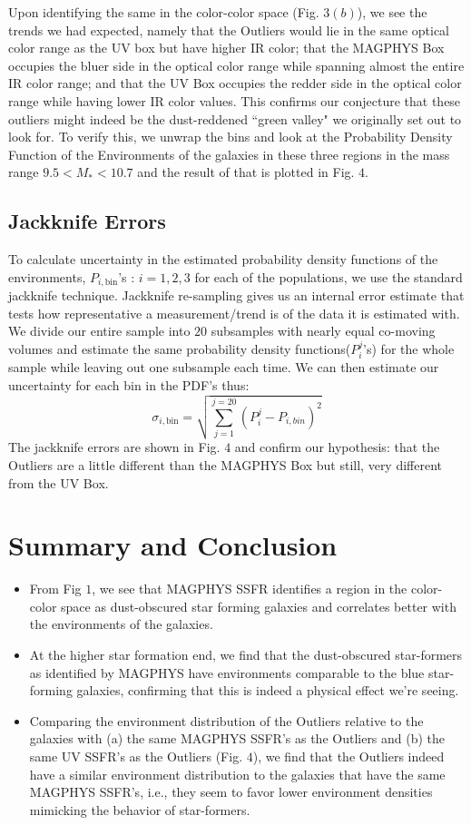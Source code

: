 \documentclass[iop]{emulateapj}
\begin{document}
Upon identifying the same in the color-color space (Fig. $3(b)$), we see the trends we had expected, namely that the Outliers would lie in the same optical color range as the UV box but have higher IR color; that the MAGPHYS Box occupies the bluer side in the optical color range while spanning almost the entire IR color range; and that the UV Box occupies the redder side in the optical color range while having lower IR color values. This confirms our conjecture  that these outliers might indeed be the dust-reddened ``green valley" we originally set out to look for. To verify this, we unwrap the bins and look at the Probability Density Function of the Environments of the galaxies in these three regions in the mass range  $ 9.5 < M_{*} < 10.7$ and the result of that is plotted in Fig. $4$.

\subsection{Jackknife Errors}

To calculate uncertainty in the estimated probability density functions of the environments, $P_{i,\mathrm{bin}}$'s : $i = 1,2,3$ for each of the populations, we use the standard jackknife technique. Jackknife re-sampling gives us an internal error estimate that tests how representative a measurement/trend is of the data it is estimated with. We divide our entire sample into $20$ subsamples with nearly equal co-moving volumes and estimate the same probability density functions($P^{j}_{i}$'s) for the whole sample while leaving out one subsample each time. We can then estimate our uncertainty for each bin in the PDF's thus:
$$ \sigma_{i, \mathrm{bin}} = \sqrt{\sum_{j = 1}^{j = 20} (P^{j}_{i} - P_{i,bin})^{2}} $$
The jackknife errors are shown in Fig. $4$ and confirm our hypothesis: that the Outliers are a little different than the MAGPHYS Box but still, very different from the UV Box.

\section{Summary and Conclusion}


\begin{itemize}
\item{From Fig $1$, we see that MAGPHYS SSFR identifies a region in the color-color space as dust-obscured star forming galaxies and correlates better with the environments of the galaxies.}
\item{At the higher star formation end, we find that the dust-obscured star-formers as identified by MAGPHYS have environments comparable to the blue star-forming galaxies, confirming that this is indeed a physical effect we're seeing.}
\item{Comparing the environment distribution of the Outliers relative to the galaxies with (a) the same MAGPHYS SSFR's as the Outliers and (b) the same UV SSFR's as the Outliers (Fig. $4$), we find that the Outliers indeed have a similar environment distribution to the galaxies that have the same MAGPHYS SSFR's, i.e., they seem to favor lower environment densities mimicking the behavior of star-formers.}
\end{itemize}
\end{document}
